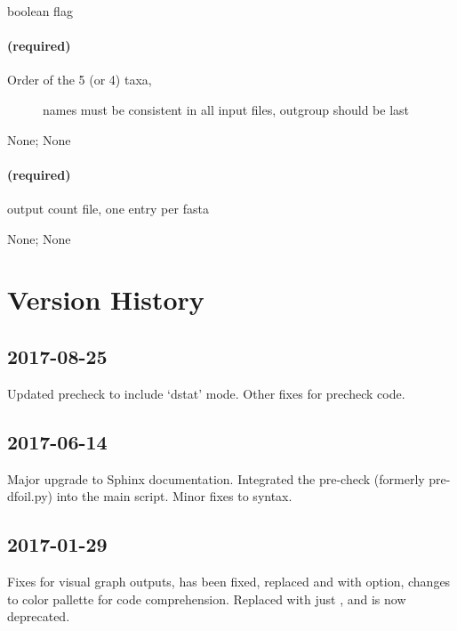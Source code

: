 \documentclass[letterpaper,12pt,english]{sphinxmanual}
\begin{document}
 boolean flag


\subsubsection{ (required)}
\label{\detokenize{prog_desc:names-n-required}}\begin{description}
\item[{ Order of the 5 (or 4) taxa,}] \leavevmode
names must be
consistent in all input files,
outgroup should be last

\end{description}

 None;  None


\subsubsection{ (required)}
\label{\detokenize{prog_desc:out-o-required}}
 output count file, one entry per fasta

 None;  None


\chapter{Version History}
\label{\detokenize{releases:version-history}}\label{\detokenize{releases::doc}}

\section{2017-08-25}
\label{\detokenize{releases:id1}}
Updated precheck to include ‘dstat’ mode. Other fixes for precheck code.


\section{2017-06-14}
\label{\detokenize{releases:id2}}
Major upgrade to Sphinx documentation. Integrated the pre-check (formerly pre-dfoil.py) into the main script. Minor fixes to syntax.


\section{2017-01-29}
\label{\detokenize{releases:id3}}
Fixes for visual graph outputs,  has been fixed, replaced  and  with  option, changes to color pallette for code comprehension. Replaced  with just , and  is now deprecated.
\end{document}
